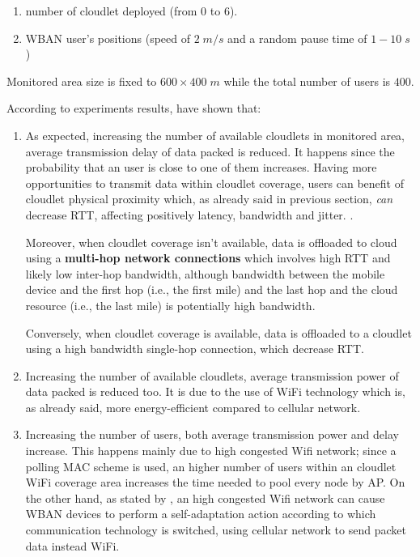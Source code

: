 \documentclass[sigchi]{acmart}
\begin{document}
\begin{enumerate}
\item number of cloudlet deployed (from 0 to 6).
\item WBAN user's positions (speed of $2\;m/s$ and a random pause time of $1-10\;s$)
\end{enumerate}

Monitored area size is fixed to $600 \times 400\;m$ while the total number of users is $400$.

According to experiments results, \cite{MSAReport} have shown that:

\begin{enumerate}

\item As expected, increasing the number of available cloudlets in monitored area, average transmission delay of data packed is reduced. It happens since the probability  that an user is close to one of them increases. Having more opportunities to transmit data within cloudlet coverage, users can benefit of cloudlet physical proximity which, as already said in previous section, \textit{can} decrease RTT, affecting positively latency, bandwidth and jitter. \cite{TheEmergenceOfEdgeComputing}. 

Moreover, when cloudlet coverage isn't available, data is offloaded to cloud using a \textbf{multi-hop network connections} which involves high RTT and likely low inter-hop bandwidth, although bandwidth between the mobile device and the first hop (i.e., the first mile) and the last hop and the cloud resource (i.e., the last mile) is potentially high bandwidth.\cite{ArchitecturalTacticsCyberForaging}

Conversely, when cloudlet coverage is available, data is offloaded to a cloudlet using a high bandwidth single-hop connection, which decrease RTT.

\item Increasing the number of available cloudlets, average transmission power of data packed is reduced too. It is due to the use of WiFi technology which is, as already said, more energy-efficient compared to cellular network.

\item Increasing the number of users, both average transmission power and delay increase. This happens mainly due to high congested Wifi network; since a polling MAC scheme is used, an higher number of users within an cloudlet WiFi coverage area increases the time needed to pool every node by AP. On the other hand, as stated by \citep{MSAReport}, an high congested Wifi network can cause WBAN devices to perform a self-adaptation action according to which communication technology is switched, using cellular network to send packet data instead WiFi.

\end{enumerate}
\end{document}
